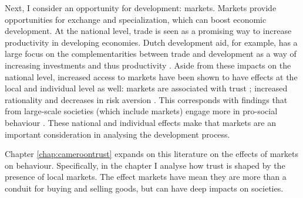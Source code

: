 Next, I consider an opportunity for development: markets. Markets provide opportunities for exchange and specialization, which can boost economic development. At the national level, trade is seen as a promising way to increase productivity in developing economies. Dutch development aid, for example, has a large focus on the complementarities between trade and development as a way of increasing investments and thus productivity \citep[see e.g.][]{Zoomers2014}. Aside from these impacts on the national level, increased access to markets have been shown to have effects at the local and individual level as well: markets are associated with trust \citep{Tu2010,Fischer2008}; increased rationality \citep{List2008,Cecchi2013,Braga2009} and decreases in risk aversion \citep{Melesse2015}. This corresponds with findings that from large-scale societies (which include markets) engage more in pro-social behaviour \cite{Henrich2005,Henrich2010}. These national and individual effects make that markets are an important consideration in analysing the development process. 

Chapter \ref{chap:cameroontrust} expands on this literature on the effects of markets on behaviour. Specifically, in the chapter I analyse how trust is shaped by the presence of local markets. The effect markets have mean they are more than a conduit for buying and selling goods, but can have deep impacts on societies. 

